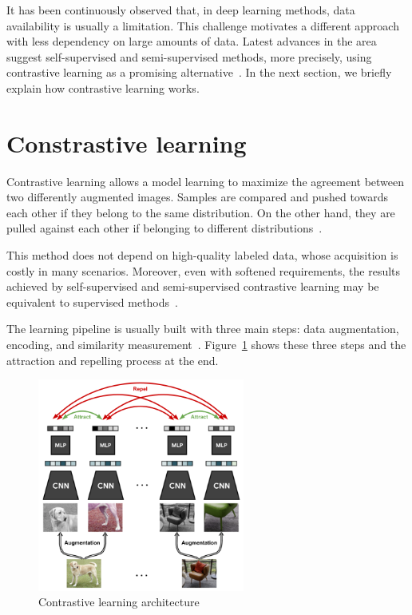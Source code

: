 \documentclass[12pt]{article}
\begin{document}
It has been continuously observed that, in deep learning methods, data availability is usually a limitation. This challenge motivates a different approach with less dependency on large amounts of data. Latest advances in the area suggest self-supervised and semi-supervised methods, more precisely, using contrastive learning as a promising alternative~\cite{guldenring2021}. %
In the next section, we briefly explain how contrastive learning works.

\section{Constrastive learning}\label{section:constrastive-learning}

Contrastive learning allows a model learning to maximize the agreement between two differently augmented images. Samples are compared and pushed towards each other if they belong to the same distribution. On the other hand, they are pulled against each other if belonging to different distributions~\cite{chen2020}.

This method does not depend on high-quality labeled data, whose acquisition is costly in many scenarios. Moreover, even with softened requirements, the results achieved by self-supervised and semi-supervised contrastive learning may be equivalent to supervised methods~\citep{chen2020}.

The learning pipeline is usually built with three main steps: data augmentation, encoding, and similarity measurement~\citep{ashish2020}. Figure~\ref{figure:contrastive_learning} shows these three steps and the attraction and repelling process at the end.

\begin{figure}[ht]
\centering
\includegraphics[height=7cm]{res/contrastive_learning}
\caption{\label{figure:contrastive_learning}Contrastive learning architecture~\citep{ashish2020}}
\end{figure}
\end{document}
